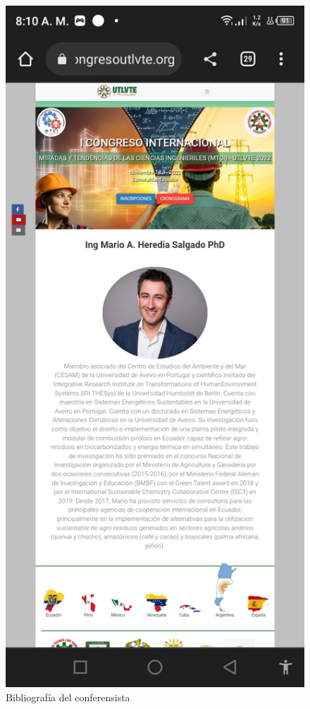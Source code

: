 \documentclass[a4paper,14px]{article}
\begin{document}
\hspace{0.5cm}
\begin{minipage}[H]{0.5\linewidth}
  \begin{figure}[H]
    \centering
    \includegraphics[scale=0.3]{bibliografia.jpg}
    \caption{Bibliografía del conferensista}
    \label{fig:bibliografia}
  \end{figure}
\end{minipage}
\end{document}
